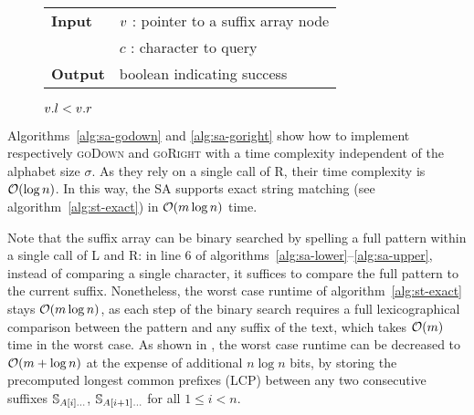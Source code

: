 \begin{figure*}[b!]
\begin{center}
\begin{minipage}[t]{.6\textwidth}
\begin{algorithm}[H]
\begin{tabular}{ll}
\textbf{Input}  & $v$ : pointer to a suffix array node\\
				& $c$ : character to query\\
\textbf{Output} & boolean indicating success\\
\end{tabular}
\begin{algorithmic}[1]
	\State \Return \False
\EndIf
{}
\State \Return $v.l < v.r$
\end{algorithmic}
\label{alg:sa-godownc}
\end{algorithm}
\end{minipage}
\end{center}
\end{figure*}

Algorithms~\ref{alg:sa-godown} and \ref{alg:sa-goright} show how to implement respectively \textsc{goDown} and \textsc{goRight} with a time complexity independent of the alphabet size $\sigma$.
As they rely on a single call of \textsc{R}, their time complexity is $\mathcal{O}(\log{n})$.
In this way, the SA supports exact string matching (see algorithm~\ref{alg:st-exact}) in $\mathcal{O}(m \log{n})$ time.

Note that the suffix array can be binary searched by spelling a full pattern within a single call of \textsc{L} and \textsc{R}: in line 6 of algorithms~\ref{alg:sa-lower}--\ref{alg:sa-upper}, instead of comparing a single character, it suffices to compare the full pattern to the current suffix.
Nonetheless, the worst case runtime of algorithm~\ref{alg:st-exact} stays $\mathcal{O}(m \log{n})$, as each step of the binary search requires a full lexicographical comparison between the pattern and any suffix of the text, which takes $\mathcal{O}(m)$ time in the worst case.
As shown in \citep{Manber1990}, the worst case runtime can be decreased to $\mathcal{O}(m + \log{n})$ at the expense of additional $n \log{n}$ bits, by storing the precomputed longest common prefixes (LCP) between any two consecutive suffixes $\mathbb{S}_{A[i] \dots}$, $\mathbb{S}_{A[i+1] \dots}$ for all $1 \leq i < n$.

